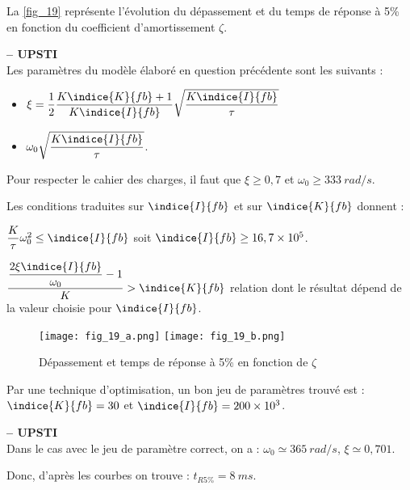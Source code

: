 La \autoref{fig_19} représente l'évolution du dépassement et du temps de réponse à 5\% en fonction du
coefficient d'amortissement $\zeta$.

\ifprof
\begin{corrige}\textbf{ -- UPSTI}\\ 
Les paramètres du modèle élaboré en question précédente sont les suivants :
\begin{itemize}
\item  $\xi=\dfrac{1}{2} \dfrac{K\indice{K}{fb}+1}{K\indice{I}{fb}}\sqrt{\dfrac{K\indice{I}{fb}}{\tau}}$
\item  $\omega_0\sqrt{\dfrac{K\indice{I}{fb}}{\tau}}$.
\end{itemize}
Pour respecter le cahier des charges, il faut que $\xi \geq 0,7$ et $\omega_0 \geq \SI{333}{rad/s}$.


Les conditions traduites sur $\indice{I}{fb}$ et sur $\indice{K}{fb}$ donnent :

$\dfrac{K}{\tau} \omega_0^2 \leq \indice{I}{fb}$ soit $\indice{I}{fb}\geq 16,7\times 10^5$.

$\dfrac{\dfrac{2\xi \indice{I}{fb}}{\omega_0}-1}{K} > \indice{K}{fb}$
relation dont le résultat dépend de la valeur choisie pour $\indice{I}{fb}$.

\end{corrige}
\else
\fi

\ifprof\else
\begin{figure}[H]
\centering
\texttt{[image: fig\_19\_a.png]}
\texttt{[image: fig\_19\_b.png]}
\caption{Dépassement et temps de réponse à 5\% en fonction de $\zeta$ \label{fig_19}}
\end{figure}


Par une technique d’optimisation, un bon jeu de paramètres trouvé est : $\indice{K}{fb}=30$ et $\indice{I}{fb}=200\times10^{3}$.
\fi

\ifprof
\begin{corrige}\textbf{ -- UPSTI}\\ 
Dans le cas avec le jeu de paramètre correct, on a : $\omega_0 \simeq \SI{365}{rad/s}$, $\xi \simeq 0,701$.

Donc, d’après les courbes on trouve : $t_{R5\%} = \SI{8}{ms}$.


\end{corrige}
\else
\fi

